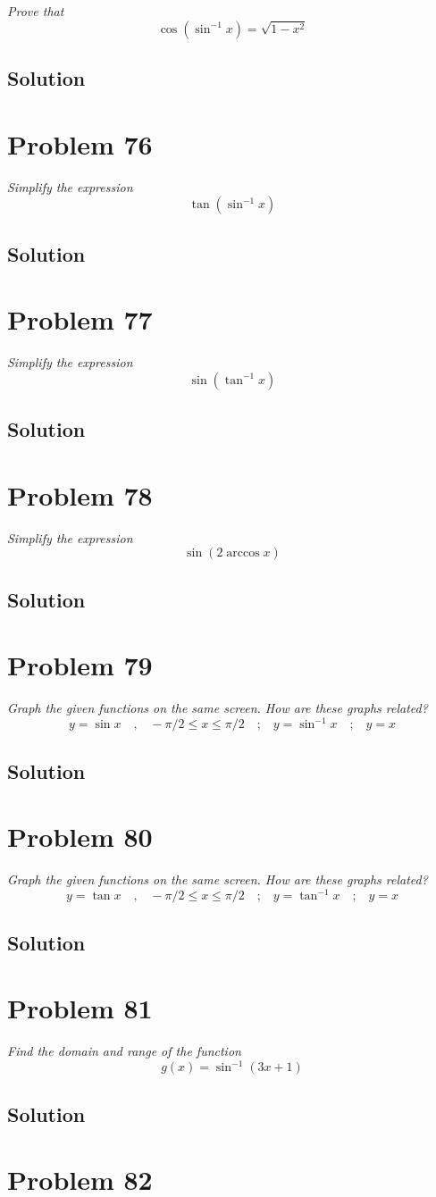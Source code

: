 \documentclass[11pt]{article}
\newcommand{\soln}{\subsection*}
\newcommand{\qn}{\textit}
\newcommand{\eqtext}[1]{\quad\text{#1}\quad}
\begin{document}
\qn{Prove that $$\cos(\sin^{-1}x)=\sqrt{1-x^2}$$}

\soln{Solution}

\section*{Problem 76}

\qn{Simplify the expression $$\tan(\sin^{-1}x)$$}

\soln{Solution}

\section*{Problem 77}

\qn{Simplify the expression $$\sin(\tan^{-1}x)$$}

\soln{Solution}

\section*{Problem 78}

\qn{Simplify the expression $$\sin(2\arccos{x})$$}

\soln{Solution}

\section*{Problem 79}

\qn{Graph the given functions on the same screen. How are these graphs related? $$y=\sin{x} \eqtext{,} -\pi/2 \le x \le \pi/2 \eqtext{;} y=\sin^{-1}x \eqtext{;} y=x$$}
\soln{Solution}

\section*{Problem 80}

\qn{Graph the given functions on the same screen. How are these graphs related? $$y=\tan{x} \eqtext{,} -\pi/2 \le x \le \pi/2 \eqtext{;} y=\tan^{-1}x \eqtext{;} y=x$$}
\soln{Solution}

\section*{Problem 81}

\qn{Find the domain and range of the function $$g(x)=\sin^{-1}(3x+1)$$}

\soln{Solution}

\section*{Problem 82}
\end{document}
